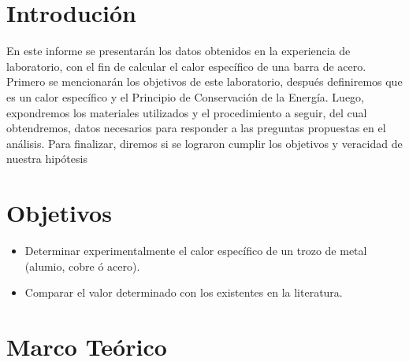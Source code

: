 \documentclass[a4paper, 12p]{article}
\begin{document}
\section{Introdución}
En este informe se presentarán los datos obtenidos en la experiencia de laboratorio, con el fin de calcular el calor específico de una barra de acero.
Primero se mencionarán los objetivos de este laboratorio, después definiremos que es un calor específico y el Principio de Conservación de la Energía. 
Luego, expondremos los materiales utilizados y el procedimiento a seguir, del cual obtendremos, datos necesarios para responder a las preguntas propuestas en el análisis.
Para finalizar, diremos si se lograron cumplir los objetivos y veracidad de nuestra hipótesis

\section{Objetivos}
\begin{itemize}
      \item Determinar experimentalmente el calor específico de un trozo de metal (alumio, cobre ó acero).
      \item Comparar el valor determinado con los existentes en la literatura.
\end{itemize}



\section{Marco Teórico} 
\end{document}
